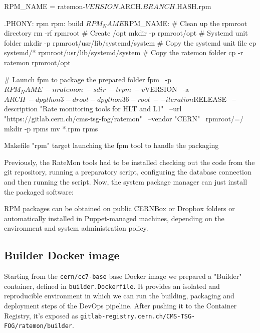 \begin{listing}[ht]
\begin{yamlcode}

RPM_NAME = ratemon-${VERSION}.${ARCH}.${BRANCH}.${HASH}.rpm

.PHONY: rpm
rpm: build ${RPM_NAME}
${RPM_NAME}:
  # Clean up the rpmroot directory
  rm -rf rpmroot
  # Create /opt
  mkdir -p rpmroot/opt
  # Systemd unit folder
  mkdir -p rpmroot/usr/lib/systemd/system
  # Copy the systemd unit file
  cp systemd/* rpmroot/usr/lib/systemd/system
  # Copy the ratemon folder
  cp -r ratemon rpmroot/opt

  # Launch fpm to package the prepared folder 
  fpm \
  -p ${RPM_NAME} \
  -n ratemon \
  -s dir \
  -t rpm \
  -v ${VERSION} \
  -a ${ARCH} \
  -d python3 -d root -d python36-root \
  --iteration ${RELEASE} \
  --description "Rate monitoring tools for HLT and L1" \
  --url "https://gitlab.cern.ch/cms-tsg-fog/ratemon" \
  --vendor "CERN" \
  rpmroot/=/
  mkdir -p rpms
  mv *.rpm rpms
\end{yamlcode}
\caption{Makefile "rpm" target launching the fpm tool to handle the packaging}
\end{listing}

Previously, the RateMon tools had to be installed checking out the code from the git repository, running a preparatory script, configuring the database connection and then running the script. Now, the system package manager can just install the packaged software:

\begin{textcode}
P5 $ dnf -i ratemon_0.1.rpm
\end{textcode}

RPM packages can be obtained on public CERNBox or Dropbox folders or automatically installed in Puppet-managed machines, depending on the environment and system administration policy.

\subsection{Builder Docker image}

Starting from the \texttt{cern/cc7-base} base Docker image we prepared a "Builder" container, defined in \texttt{builder.Dockerfile}. It provides an isolated and reproducible environment in which we can run the building, packaging and deployment steps of the DevOps pipeline.
After pushing it to the Container Registry, it's exposed as \texttt{gitlab-registry.cern.ch/CMS-TSG-FOG/ratemon/builder}.

